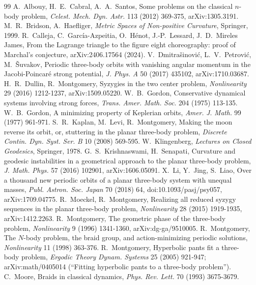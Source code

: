 \documentclass[11pt]{article}
\theoremstyle{definition}
\begin{document}
\begin{thebibliography}{99}
 A.~Albouy, H.~E.~Cabral, A.~A.~Santos, Some problems on the classical $n$-body problem,
\emph{Celest. Mech. Dyn. Astr.} 113 (2012) 369-375, arXiv:1305.3191.
 M.~R.~Bridson, A.~Haefliger, \emph{Metric Spaces of Non-positive Curvature}, Springer, 1999.
 R.~Calleja, C.~Garc\'ia-Azpeitia, O.~H\'enot, J.-P.~Lessard, J.~D.~Mireles James, From the Lagrange
triangle to the figure eight choreography: proof of Marchal's conjecture, arXiv:2406.17564 (2024).
 V.~Dmitra\v{s}inovi\'c, L.~V.~Petrovi\'c, M.~\v{S}uvakov, Periodic three-body orbits with vanishing
angular momentum in the Jacobi-Poincar\'e strong potential, \emph{J. Phys. A} 50 (2017) 435102, arXiv:1710.03687.
 H.~R.~Dullin, R.~Montgomery, Syzygies in the two center problem, \emph{Nonlinearity} 29 (2016) 1212-1237,
arXiv:1509.05220.
 W.~B.~Gordon, Conservative dynamical systems involving strong forces, \emph{Trans. Amer. Math. Soc.}
204 (1975) 113-135.
 W.~B.~Gordon, A minimizing property of Keplerian orbits, \emph{Amer. J. Math.} 99 (1977) 961-971.
 S.~R.~Kaplan, M.~Levi, R.~Montgomery, Making the moon reverse its orbit, or, stuttering in the planar
three-body problem, \emph{Discrete Contin. Dyn. Syst. Ser. B} 10 (2008) 569-595.
 W.~Klingenberg, \emph{Lectures on Closed Geodesics}, Springer, 1978.
 G.~S.~Krishnaswami, H.~Senapati, Curvature and geodesic instabilities in a geometrical approach to the
planar three-body problem, \emph{J. Math. Phys.} 57 (2016) 102901, arXiv:1606.05091.
 X.~Li, Y.~Jing, S.~Liao, Over a thousand new periodic orbits of a planar three-body system with unequal
masses, \emph{Publ. Astron. Soc. Japan} 70 (2018) 64, doi:10.1093/pasj/psy057, arXiv:1709.04775.
 R.~Moeckel, R.~Montgomery, Realizing all reduced syzygy sequences in the planar three-body problem,
\emph{Nonlinearity} 28 (2015) 1919-1935, arXiv:1412.2263.
 R.~Montgomery, The geometric phase of the three-body problem, \emph{Nonlinearity} 9 (1996) 1341-1360,
arXiv:dg-ga/9510005.
 R.~Montgomery, The $N$-body problem, the braid group, and action-minimizing periodic solutions,
\emph{Nonlinearity} 11 (1998) 363-376.
 R.~Montgomery, Hyperbolic pants fit a three-body problem, \emph{Ergodic Theory Dynam. Systems} 25 (2005)
921-947; arXiv:math/0405014 (``Fitting hyperbolic pants to a three-body problem'').
 C.~Moore, Braids in classical dynamics, \emph{Phys. Rev. Lett.} 70 (1993) 3675-3679.
\end{thebibliography}
\end{document}
